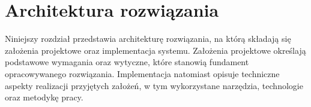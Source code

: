 \chapter{Architektura rozwiązania}
Niniejszy rozdział przedstawia architekturę rozwiązania, na którą składają się założenia projektowe oraz implementacja systemu. Założenia projektowe określają podstawowe wymagania oraz wytyczne, które stanowią fundament opracowywanego rozwiązania. Implementacja natomiast opisuje techniczne aspekty realizacji przyjętych założeń, w tym wykorzystane narzędzia, technologie oraz metodykę pracy. 





